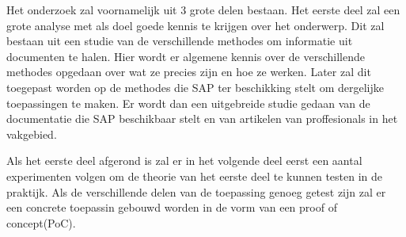 %
%
%
%
%

Het onderzoek zal voornamelijk uit 3 grote delen bestaan.
Het eerste deel zal een grote analyse met als doel goede kennis te krijgen over het onderwerp. Dit zal bestaan uit een studie van de verschillende methodes om informatie uit documenten te halen. Hier wordt er algemene kennis over de verschillende methodes opgedaan over wat ze precies zijn en hoe ze werken. Later zal dit toegepast worden op de methodes die SAP ter beschikking stelt om dergelijke toepassingen te maken. Er wordt dan een uitgebreide studie gedaan van de documentatie die SAP beschikbaar stelt en van artikelen van proffesionals in het vakgebied. 

Als het eerste deel afgerond is zal er in het volgende deel eerst een aantal experimenten volgen om de theorie van het eerste deel te kunnen testen in de praktijk. Als de verschillende delen van de toepassing genoeg getest zijn zal er een concrete toepassin gebouwd worden in de vorm van een proof of concept(PoC). 

